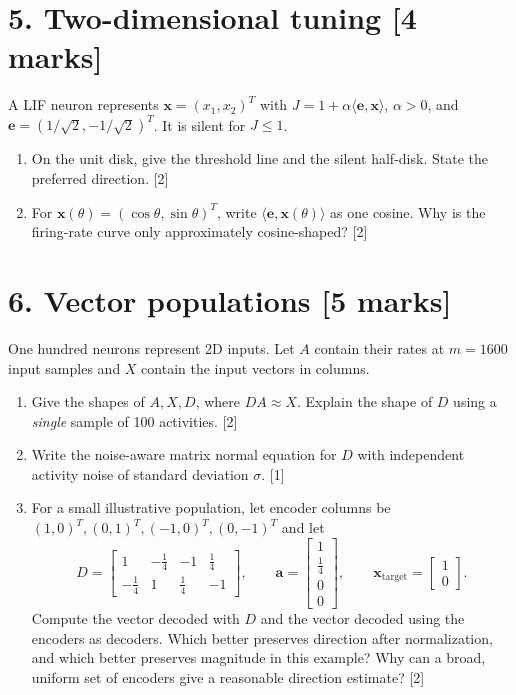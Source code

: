 \documentclass[10pt,letterpaper]{article}
\newcommand{\vct}[1]{\boldsymbol{#1}}
\begin{document}
\section*{5. Two-dimensional tuning \hfill [4 marks]}
A LIF neuron represents \(\vct{x}=(x_1,x_2)^T\) with
\(J=1+\alpha\langle\vct{e},\vct{x}\rangle\), \(\alpha>0\), and \(\vct{e}=(1/\sqrt2,-1/\sqrt2)^T\). It is silent for \(J\leq1\).
\begin{enumerate}[label=\textbf{(\alph*)}]
\item On the unit disk, give the threshold line and the silent half-disk. State the preferred direction. [2]
\item For \(\vct{x}(\theta)=(\cos\theta,\sin\theta)^T\), write \(\langle\vct{e},\vct{x}(\theta)\rangle\) as one cosine. Why is the firing-rate curve only approximately cosine-shaped? [2]
\end{enumerate}

\section*{6. Vector populations \hfill [5 marks]}
One hundred neurons represent 2D inputs. Let \(A\) contain their rates at \(m=1600\) input samples and \(X\) contain the input vectors in columns.
\begin{enumerate}[label=\textbf{(\alph*)}]
\item Give the shapes of \(A,X,D\), where \(DA\approx X\). Explain the shape of \(D\) using a \emph{single} sample of 100 activities. [2]
\item Write the noise-aware matrix normal equation for \(D\) with independent activity noise of standard deviation \(\sigma\). [1]
\item For a small illustrative population, let encoder columns be \((1,0)^T,(0,1)^T,(-1,0)^T,(0,-1)^T\) and let
\[
D=\begin{bmatrix}1&-\tfrac14&-1&\tfrac14\\-\tfrac14&1&\tfrac14&-1\end{bmatrix},\qquad
\vct{a}=\begin{bmatrix}1\\\tfrac14\\0\\0\end{bmatrix},\qquad
\vct{x}_{\mathrm{target}}=\begin{bmatrix}1\\0\end{bmatrix}.
\]
Compute the vector decoded with \(D\) and the vector decoded using the encoders as decoders. Which better preserves direction after normalization, and which better preserves magnitude in this example? Why can a broad, uniform set of encoders give a reasonable direction estimate? [2]
\end{enumerate}
\end{document}
